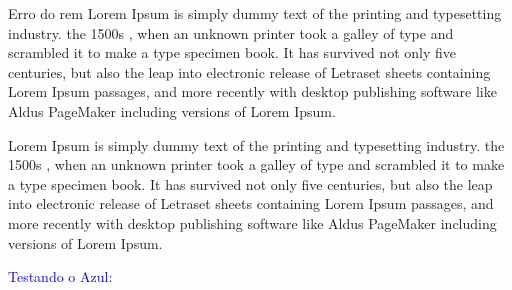 \documentclass{article}
\begin{document}

 Erro do rem
Lorem Ipsum is simply dummy text of the printing and typesetting industry. 
the 1500s \citep{b1}, when an unknown printer took a galley of type and scrambled it to make a type specimen book. It has survived not only five centuries, but also the leap into electronic 
 release of Letraset sheets containing Lorem Ipsum passages, and more recently with desktop publishing software like Aldus PageMaker including versions of Lorem Ipsum.


Lorem Ipsum is simply dummy text of the printing and typesetting industry. 
the 1500s \citep{b1}, when an unknown printer took a galley of type and scrambled it to make a type specimen book. It has survived not only five centuries, but also the leap into electronic 
 release of Letraset sheets containing Lorem Ipsum passages, and more recently with desktop publishing software like Aldus PageMaker including versions of Lorem Ipsum.

\textcolor{blue}{Testando o Azul: \citep{b1}}




    \printhacksxexeoversion
    \newpage
    \listofassunto
    \newpage
    \listofcomentario
    \newpage
    \listofcomentarioref   
    
\end{document}
